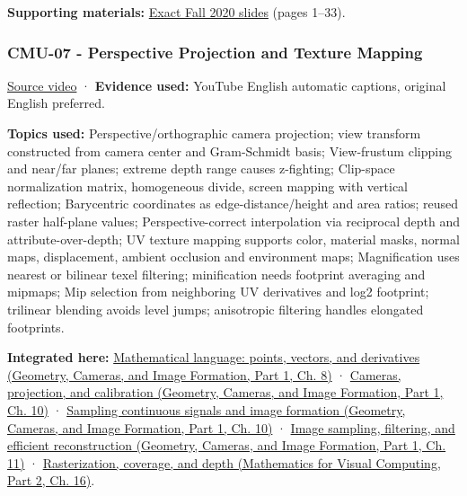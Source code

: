 \textbf{Supporting materials:} \href{https://15462.courses.cs.cmu.edu/fall2020content/lectures/06_3drotations/06_3drotations_slides.pdf}{Exact Fall 2020 slides} (pages 1--33).

\subsubsection{CMU-07 - Perspective Projection and Texture Mapping}\label{04-visual-computing-ii-ch036-cmu-07---perspective-projection-and-texture-mapping}

\hypertarget{04-visual-computing-ii-ch036-cmu-07---perspective-projection-and-texture-mapping}{}

\href{https://www.youtube.com/watch?v=_4Q4O2Kgdo4}{Source video} · \textbf{Evidence used:} YouTube English automatic captions, original English preferred.

\textbf{Topics used:} Perspective/orthographic camera projection; view transform constructed from camera center and Gram-Schmidt basis; View-frustum clipping and near/far planes; extreme depth range causes z-fighting; Clip-space normalization matrix, homogeneous divide, screen mapping with vertical reflection; Barycentric coordinates as edge-distance/height and area ratios; reused raster half-plane values; Perspective-correct interpolation via reciprocal depth and attribute-over-depth; UV texture mapping supports color, material masks, normal maps, displacement, ambient occlusion and environment maps; Magnification uses nearest or bilinear texel filtering; minification needs footprint averaging and mipmaps; Mip selection from neighboring UV derivatives and log2 footprint; trilinear blending avoids level jumps; anisotropic filtering handles elongated footprints.

\textbf{Integrated here:} \href{../03-Geometry-Cameras-and-Image-Formation-P01/main.pdf\#03-visual-computing-i-ch001-mathematical-language-points-vectors-and-derivatives}{Mathematical language: points, vectors, and derivatives (Geometry, Cameras, and Image Formation, Part 1, Ch. 8)} · \href{../03-Geometry-Cameras-and-Image-Formation-P01/main.pdf\#03-visual-computing-i-ch003-cameras-projection-and-calibration}{Cameras, projection, and calibration (Geometry, Cameras, and Image Formation, Part 1, Ch. 10)} · \href{../03-Geometry-Cameras-and-Image-Formation-P01/main.pdf\#03-visual-computing-i-ch003-sampling-continuous-signals-and-image-formation}{Sampling continuous signals and image formation (Geometry, Cameras, and Image Formation, Part 1, Ch. 10)} · \href{../03-Geometry-Cameras-and-Image-Formation-P01/main.pdf\#03-visual-computing-i-ch004-image-sampling-filtering-and-efficient-reconstruction}{Image sampling, filtering, and efficient reconstruction (Geometry, Cameras, and Image Formation, Part 1, Ch. 11)} · \href{../02-Mathematics-for-Visual-Computing-P02/main.pdf\#03-visual-computing-i-ch012-rasterization-coverage-and-depth}{Rasterization, coverage, and depth (Mathematics for Visual Computing, Part 2, Ch. 16)}.

